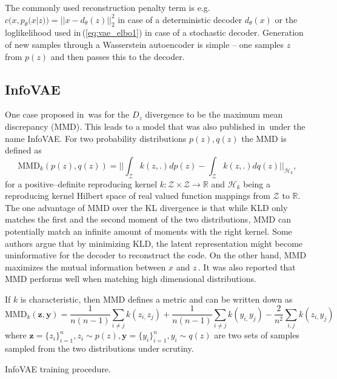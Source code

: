 The commonly used reconstruction penalty term is e.g. $c(x,p_{\theta}(x|z))=||x-d_{\theta}(z)||_{2}^{2}$
in case of a deterministic decoder $d_{\theta}(x)$ or the loglikelihood
used in\,(\ref{eq:vae_elbo1}) in case of a stochastic decoder. Generation
of new samples through a Wasserstein autoencoder is simple -- one
samples $z$ from $p(z)$ and then passes this to the decoder.

\subsection{InfoVAE}

One case proposed in\,\cite{tolstikhin2017wasserstein} was for the
$D_{z}$ divergence to be the maximum mean discrepancy (MMD). This
leads to a model that was also published in\,\cite{zhao2017infovae}
under the name InfoVAE. For two probability distributions $p(z),q(z)$
the MMD is defined as
\begin{equation}
\text{MMD}_{k}(p(z),q(z))=||\int_{\mathcal{Z}}k(z,.)dp(z)-\int_{\mathcal{Z}}k(z,.)dq(z)||_{\mathcal{H}_{k}},
\end{equation}
for a positive--definite reproducing kernel $k:\mathcal{Z}\times\mathcal{Z}\rightarrow\mathbb{R}$
and $\mathcal{H}_{k}$ being a reproducing kernel Hilbert space of
real valued function mappings from $\mathcal{Z}$ to $\mathbb{R}$.
The one advantage of MMD over the KL divergence is that while KLD
only matches the first and the second moment of the two distributions,
MMD can potentially match an infinite amount of moments with the right
kernel. Some authors argue that by minimizing KLD, the latent representation
might become uninformative for the decoder to reconstruct the code.
On the other hand, MMD maximizes the mutual information between $x$
and $z$\,\cite{zhao2017infovae}. It was also reported that MMD
performs well when matching high dimensional distributions. 

If $k$ is characteristic, then MMD defines a metric and can be written
down as 
\begin{equation}
\text{MMD}_{k}(\boldsymbol{z},\boldsymbol{y})=\frac{1}{n(n-1)}\sum_{i\neq j}k(z_{i,}z_{j})+\frac{1}{n(n-1)}\sum_{i\neq j}k(y_{i,}y_{j})-\frac{2}{n^{2}}\sum_{i,j}k(z_{i,}y_{j})\label{eq:mmd}
\end{equation}
where $\boldsymbol{z}=\{z_{i}\}_{i=1}^{n},z_{i}\sim p(z),\boldsymbol{y}=\{y_{i}\}_{i=1}^{n},y_{i}\sim q(z)$
are two sets of samples sampled from the two distributions under scrutiny.
\begin{algorithm}


\caption{InfoVAE training procedure.}
\label{alg:infovae}
\end{algorithm}

